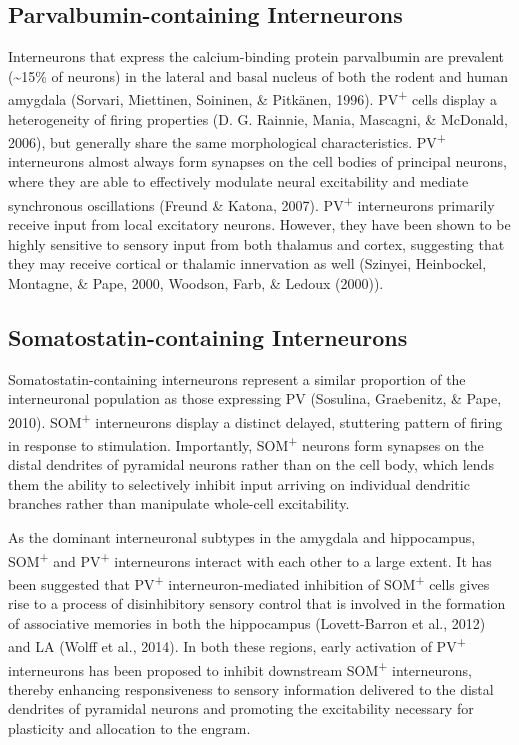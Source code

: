 \documentclass[12pt,a4paper,]{report}
\begin{document}
\subsection{Parvalbumin-containing
Interneurons}\label{parvalbumin-containing-interneurons}

Interneurons that express the calcium-binding protein parvalbumin are
prevalent (\textasciitilde{}15\% of neurons) in the lateral and basal
nucleus of both the rodent and human amygdala (Sorvari, Miettinen,
Soininen, \& Pitkänen, 1996). PV\textsuperscript{+} cells display a
heterogeneity of firing properties (D. G. Rainnie, Mania, Mascagni, \&
McDonald, 2006), but generally share the same morphological
characteristics. PV\textsuperscript{+} interneurons almost always form
synapses on the cell bodies of principal neurons, where they are able to
effectively modulate neural excitability and mediate synchronous
oscillations (Freund \& Katona, 2007). PV\textsuperscript{+}
interneurons primarily receive input from local excitatory neurons.
However, they have been shown to be highly sensitive to sensory input
from both thalamus and cortex, suggesting that they may receive cortical
or thalamic innervation as well (Szinyei, Heinbockel, Montagne, \& Pape,
2000, Woodson, Farb, \& Ledoux (2000)).

\subsection{Somatostatin-containing
Interneurons}\label{somatostatin-containing-interneurons}

Somatostatin-containing interneurons represent a similar proportion of
the interneuronal population as those expressing PV (Sosulina,
Graebenitz, \& Pape, 2010). SOM\textsuperscript{+} interneurons display
a distinct delayed, stuttering pattern of firing in response to
stimulation. Importantly, SOM\textsuperscript{+} neurons form synapses
on the distal dendrites of pyramidal neurons rather than on the cell
body, which lends them the ability to selectively inhibit input arriving
on individual dendritic branches rather than manipulate whole-cell
excitability.

As the dominant interneuronal subtypes in the amygdala and hippocampus,
SOM\textsuperscript{+} and PV\textsuperscript{+} interneurons interact
with each other to a large extent. It has been suggested that
PV\textsuperscript{+} interneuron-mediated inhibition of
SOM\textsuperscript{+} cells gives rise to a process of disinhibitory
sensory control that is involved in the formation of associative
memories in both the hippocampus (Lovett-Barron et al., 2012) and LA
(Wolff et al., 2014). In both these regions, early activation of
PV\textsuperscript{+} interneurons has been proposed to inhibit
downstream SOM\textsuperscript{+} interneurons, thereby enhancing
responsiveness to sensory information delivered to the distal dendrites
of pyramidal neurons and promoting the excitability necessary for
plasticity and allocation to the engram.
\end{document}
